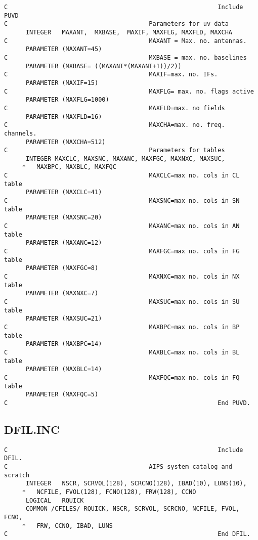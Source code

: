 \begin{verbatim}
C                                                          Include PUVD
C                                       Parameters for uv data
      INTEGER   MAXANT,  MXBASE,  MAXIF, MAXFLG, MAXFLD, MAXCHA
C                                       MAXANT = Max. no. antennas.
      PARAMETER (MAXANT=45)
C                                       MXBASE = max. no. baselines
      PARAMETER (MXBASE= ((MAXANT*(MAXANT+1))/2))
C                                       MAXIF=max. no. IFs.
      PARAMETER (MAXIF=15)
C                                       MAXFLG= max. no. flags active
      PARAMETER (MAXFLG=1000)
C                                       MAXFLD=max. no fields
      PARAMETER (MAXFLD=16)
C                                       MAXCHA=max. no. freq. channels.
      PARAMETER (MAXCHA=512)
C                                       Parameters for tables
      INTEGER MAXCLC, MAXSNC, MAXANC, MAXFGC, MAXNXC, MAXSUC,
     *   MAXBPC, MAXBLC, MAXFQC
C                                       MAXCLC=max no. cols in CL table
      PARAMETER (MAXCLC=41)
C                                       MAXSNC=max no. cols in SN table
      PARAMETER (MAXSNC=20)
C                                       MAXANC=max no. cols in AN table
      PARAMETER (MAXANC=12)
C                                       MAXFGC=max no. cols in FG table
      PARAMETER (MAXFGC=8)
C                                       MAXNXC=max no. cols in NX table
      PARAMETER (MAXNXC=7)
C                                       MAXSUC=max no. cols in SU table
      PARAMETER (MAXSUC=21)
C                                       MAXBPC=max no. cols in BP table
      PARAMETER (MAXBPC=14)
C                                       MAXBLC=max no. cols in BL table
      PARAMETER (MAXBLC=14)
C                                       MAXFQC=max no. cols in FQ table
      PARAMETER (MAXFQC=5)
C                                                          End PUVD.

\end{verbatim}
\subsection{DFIL.INC}

\begin{verbatim}
C                                                          Include DFIL.
C                                       AIPS system catalog and scratch
      INTEGER   NSCR, SCRVOL(128), SCRCNO(128), IBAD(10), LUNS(10),
     *   NCFILE, FVOL(128), FCNO(128), FRW(128), CCNO
      LOGICAL   RQUICK
      COMMON /CFILES/ RQUICK, NSCR, SCRVOL, SCRCNO, NCFILE, FVOL, FCNO,
     *   FRW, CCNO, IBAD, LUNS
C                                                          End DFIL.


\end{verbatim}
